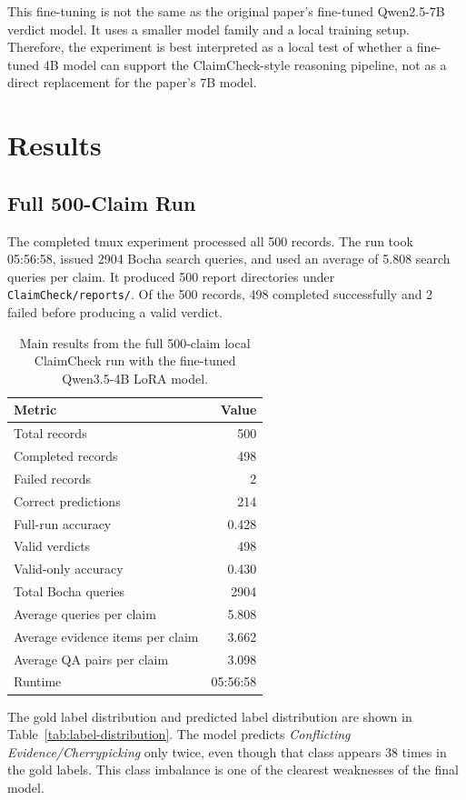 \documentclass[11pt]{article}
\begin{document}
This fine-tuning is not the same as the original paper's fine-tuned Qwen2.5-7B verdict model. It uses a smaller model family and a local training setup. Therefore, the experiment is best interpreted as a local test of whether a fine-tuned 4B model can support the ClaimCheck-style reasoning pipeline, not as a direct replacement for the paper's 7B model.

\section*{Results}
\subsection*{Full 500-Claim Run}
The completed tmux experiment processed all 500 records. The run took 05:56:58, issued 2904 Bocha search queries, and used an average of 5.808 search queries per claim. It produced 500 report directories under \texttt{ClaimCheck/reports/}. Of the 500 records, 498 completed successfully and 2 failed before producing a valid verdict.

\begin{table}[h]
\centering
\begin{tabular}{lr}
\hline
Metric & Value \\
\hline
Total records & 500 \\
Completed records & 498 \\
Failed records & 2 \\
Correct predictions & 214 \\
Full-run accuracy & 0.428 \\
Valid verdicts & 498 \\
Valid-only accuracy & 0.430 \\
Total Bocha queries & 2904 \\
Average queries per claim & 5.808 \\
Average evidence items per claim & 3.662 \\
Average QA pairs per claim & 3.098 \\
Runtime & 05:56:58 \\
\hline
\end{tabular}
\caption{Main results from the full 500-claim local ClaimCheck run with the fine-tuned Qwen3.5-4B LoRA model.}
\label{tab:main-results}
\end{table}

The gold label distribution and predicted label distribution are shown in Table~\ref{tab:label-distribution}. The model predicts \textit{Conflicting Evidence/Cherrypicking} only twice, even though that class appears 38 times in the gold labels. This class imbalance is one of the clearest weaknesses of the final model.
\end{document}
